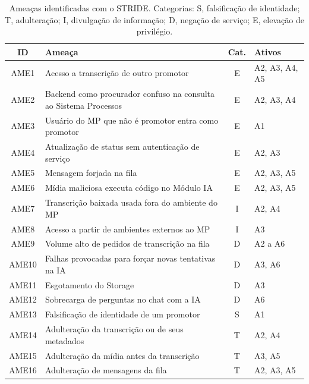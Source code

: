 \documentclass[12pt]{article}
\begin{document}
    \begin{table}[htbp]
        \centering
        \caption{Ameaças identificadas com o STRIDE. Categorias: S, falsificação de identidade; T, adulteração; I, divulgação de informação; D, negação de serviço; E, elevação de privilégio.}
        \label{tab:stride}
        \footnotesize
        \begin{tabular}{|c|p{8.4cm}|c|p{2.8cm}|}
            \hline
            \textbf{ID} & \textbf{Ameaça} & \textbf{Cat.} & \textbf{Ativos} \\
            \hline
            AME1 & Acesso a transcrição de outro promotor & E & A2, A3, A4, A5 \\
            \hline
            AME2 & Backend como procurador confuso na consulta ao Sistema Processos & E & A2, A3, A4 \\
            \hline
            AME3 & Usuário do MP que não é promotor entra como promotor & E & A1 \\
            \hline
            AME4 & Atualização de status sem autenticação de serviço & E & A2, A3 \\
            \hline
            AME5 & Mensagem forjada na fila & E & A2, A3, A5 \\
            \hline
            AME6 & Mídia maliciosa executa código no Módulo IA & E & A2, A3, A5 \\
            \hline
            AME7 & Transcrição baixada usada fora do ambiente do MP & I & A2, A4 \\
            \hline
            AME8 & Acesso a partir de ambientes externos ao MP & I & A3 \\
            \hline
            AME9 & Volume alto de pedidos de transcrição na fila & D & A2 a A6 \\
            \hline
            AME10 & Falhas provocadas para forçar novas tentativas na IA & D & A3, A6 \\
            \hline
            AME11 & Esgotamento do Storage & D & A3 \\
            \hline
            AME12 & Sobrecarga de perguntas no chat com a IA & D & A6 \\
            \hline
            AME13 & Falsificação de identidade de um promotor & S & A1 \\
            \hline
            AME14 & Adulteração da transcrição ou de seus metadados & T & A2, A4 \\
            \hline
            AME15 & Adulteração da mídia antes da transcrição & T & A3, A5 \\
            \hline
            AME16 & Adulteração de mensagens da fila & T & A2, A3, A5 \\
            \hline
        \end{tabular}
    \end{table}
\end{document}
